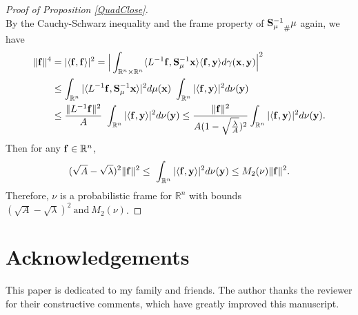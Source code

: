 \documentclass{amsart}
\numberwithin{equation}{section}
\theoremstyle{plain}
\theoremstyle{definition}
\begin{document}
\begin{proof}[Proof of Proposition \ref{QuadClose}]
\begin{equation*}
\end{equation*}
By the Cauchy-Schwarz inequality and the frame property of $ {{\bf S}_\mu^{-1}}_{\#} \mu$ again, we have
\begin{equation*}
\begin{split}
   \Vert {\bf f} \Vert^4 &=  |\langle {\bf f}, {\bf f}\rangle|^2 = \Big \vert  \int_{\mathbb{R}^n \times \mathbb{R}^n} \langle L^{-1}{\bf f},  {\bf S}_\mu^{-1} {\bf x} \rangle   \langle  {\bf f}, {\bf y} \rangle   d\gamma({\bf x},{\bf y}) \Big \vert^2\\
   & \leq \int_{\mathbb{R}^n} |\langle L^{-1}{\bf f},  {\bf S}_\mu^{-1} {\bf x} \rangle|^2 d\mu({\bf x})  \ \int_{\mathbb{R}^n} |\langle {\bf f}, {\bf y} \rangle|^2 d\nu({\bf y})\\
 &\leq \frac{ \Vert L^{-1} {\bf f} \Vert^2 }{A}    \ \int_{\mathbb{R}^n} |\langle {\bf f}, {\bf y} \rangle|^2 d\nu({\bf y})
   \leq \frac{\Vert {\bf f} \Vert^2 }{A (1-\sqrt{\frac{\lambda}{A}})^2}   \int_{\mathbb{R}^n} |\langle {\bf f}, {\bf y} \rangle|^2 d\nu({\bf y}).
\end{split}
\end{equation*}
Then for any ${\bf f} \in \mathbb{R}^n$, 
 $$ 
 (\sqrt{A}-\sqrt{\lambda})^2    \Vert  {\bf f} \Vert^2  \leq  \ \int_{\mathbb{R}^n} |\langle {\bf f}, {\bf y} \rangle|^2 d\nu({\bf y}) \leq M_2(\nu) \Vert {\bf f}  \Vert^2. 
 $$  
 Therefore, $\nu$ is a probabilistic frame for $\mathbb{R}^n$ with bounds $(\sqrt{A}-\sqrt{\lambda})^2 \ \text{and} \ M_2(\nu)$.
\end{proof}

\section*{Acknowledgements}
This paper is dedicated to my family and friends.
The author thanks the reviewer for their constructive comments, which have greatly improved this manuscript.
 

\end{document}
